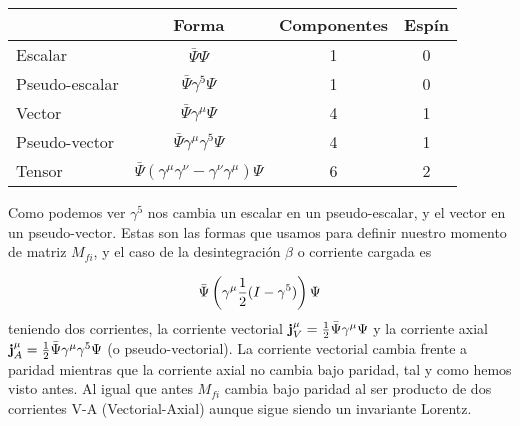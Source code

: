 \begin{table}[h!] \centering
	\begin{tabular}{l|ccc}
		& Forma & Componentes & Espín \\ \hline
		Escalar & $\bar{\Psi}\Psi$ & 1 & 0 \\
		Pseudo-escalar & $\bar{\Psi} \gamma^5 \Psi$ & 1 & 0 \\
		Vector & $\bar{\Psi} \gamma^\mu \Psi$ & 4 & 1 \\
		Pseudo-vector & $\bar{\Psi} \gamma^\mu \gamma^5 \Psi$ & 4 & 1 \\
		Tensor & $\bar{\Psi} (\gamma^\mu \gamma^\nu - \gamma^\nu \gamma^\mu) \Psi$ & 6 & 2
	\end{tabular}
\end{table}
Como podemos ver $\gamma^5$ nos cambia un escalar en un pseudo-escalar, y el vector en un pseudo-vector. Estas son las formas que usamos para definir nuestro momento de matriz $M_{fi}$, y el caso de la desintegración $\beta$ o corriente cargada es

\begin{equation}
	 \bar{\Psi}\left( \gamma^\mu \frac{1}{2}(I-\gamma^5) \right) \Psi
\end{equation}
teniendo dos corrientes, la corriente vectorial $\mathbf{j}_V^\mu=\frac{1}{2}\bar{\Psi}\gamma^\mu \Psi$ y la corriente axial  $\mathbf{j}_A^\mu=\frac{1}{2}\bar{\Psi}\gamma^\mu \gamma^5 \Psi$  (o pseudo-vectorial). La corriente vectorial cambia frente a paridad mientras que la corriente axial no cambia bajo paridad, tal y como hemos visto antes. Al igual que antes $M_{fi}$ cambia bajo paridad al ser producto de dos corrientes V-A (Vectorial-Axial) aunque sigue siendo un invariante Lorentz.















